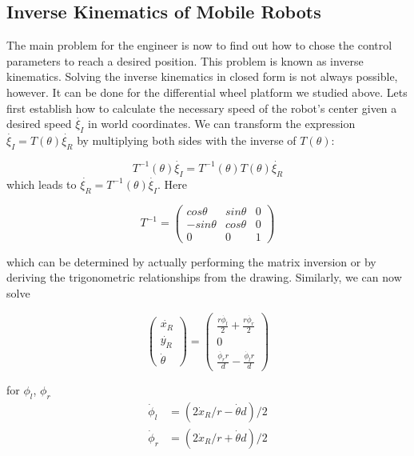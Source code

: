 \subsection{Inverse Kinematics of Mobile Robots}\label{sec:ivkmobile}
The main problem for the engineer is now to find out how to chose the control parameters to reach a desired position. This problem is known as inverse kinematics. Solving the inverse kinematics in closed form is not always possible, however. It can be done for the differential wheel platform we studied above. Lets first establish how to calculate the necessary speed of the robot's center given a desired speed $ \dot{\xi_I}$ in world coordinates. We can transform the expression $ \dot{\xi_I}=T(\theta)\dot{\xi_R}$ by multiplying both sides with the inverse of $ T(\theta)$:

\begin{equation}\label{eq:mbik}
T^{-1}(\theta)\dot{\xi_I}=T^{-1}(\theta)T(\theta)\dot{\xi_R}
\end{equation}
which leads to $ \dot{\xi_R}=T^{-1}(\theta)\dot{\xi_I}$. Here

\begin{equation}
T^{-1}=\left(\begin{array}{ccc}cos \theta & sin \theta & 0 \\ -sin \theta & cos \theta & 0 \\ 0 & 0 & 1\end{array}\right)
\end{equation}

which can be determined by actually performing the matrix inversion or by deriving the trigonometric relationships from the drawing.  Similarly, we can now solve

\begin{equation}
\left(\begin{array}{c} \dot{x_R}\\\dot{y_R}\\\dot{\theta}\end{array}\right)=\left(\begin{array}{c}\frac{r\dot{\phi_l}}{2}+\frac{r\dot{\phi_r}}{2}\\0\\\frac{\dot{\phi_r} r}{d}-\frac{\dot{\phi_l} r}{d}\end{array}\right)
\end{equation}

for $ \phi_l$, $ \phi_r$
\begin{eqnarray}
\dot{\phi}_l &= (2\dot{x}_R/r - \dot{\theta}d)/2\\
\nonumber
\dot{\phi}_r &= (2\dot{x}_R/r + \dot{\theta}d)/2
\end{eqnarray}

